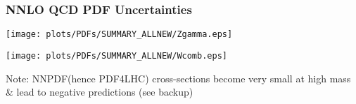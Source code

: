 \begin{frame}
	\frametitle{NNLO QCD PDF Uncertainties}
	
	\vspace{15pt}
	
	

	\vspace{-20pt}
	\begin{center}
		\texttt{[image: plots/PDFs/SUMMARY\_ALLNEW/Zgamma.eps]}
	\end{center}
	
	\begin{center}
		\texttt{[image: plots/PDFs/SUMMARY\_ALLNEW/Wcomb.eps]}
	\end{center}
	
	\cend
	{\scriptsize{
	Note: NNPDF(hence PDF4LHC) cross-sections become very small at high mass \& lead to negative predictions (see backup)}}
\end{frame}
